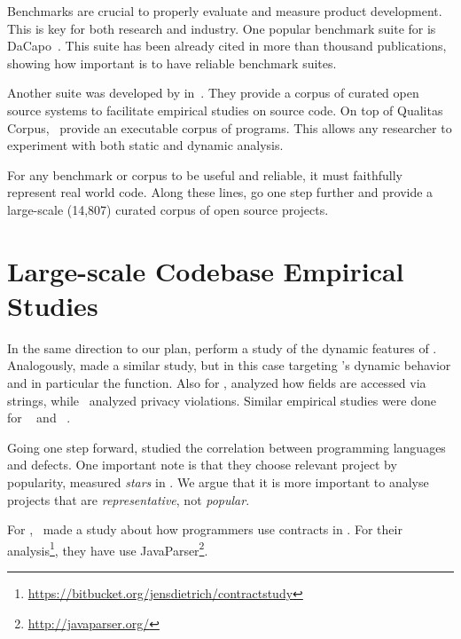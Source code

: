 Benchmarks are crucial to properly evaluate and measure product development.
This is key for both research and industry.
One popular benchmark suite for \java{} is DaCapo~\cite{blackburnDaCapoBenchmarksJava2006}.
This suite has been already cited in more than thousand publications, showing how important is to have reliable benchmark suites.

Another suite was developed by in~\cite{temperoQualitasCorpusCurated2010}.
They provide a corpus of curated open source systems to facilitate empirical studies on source code.
On top of Qualitas Corpus,~\cite{dietrichXCorpusExecutableCorpus2017} provide an executable corpus of \java{} programs.
This allows any researcher to experiment with both static and dynamic analysis.

For any benchmark or corpus to be useful and reliable, it must faithfully represent real world code.
Along these lines, \cite{allamanisMiningSourceCode2013} go one step further and provide a large-scale (14,807) curated corpus of open source \java{} projects.

\section{Large-scale Codebase Empirical Studies}
\label{sec:rw:largescale}

In the same direction to our plan, \cite{callauHowWhyDevelopers2013} perform a study of the dynamic features of \smalltalk{}. 
Analogously, \cite{richardsAnalysisDynamicBehavior2010,richardsEvalThatMen2011} made a similar study, but in this case targeting \javascript{}'s dynamic behavior and in particular the  function. 
Also for \javascript{}, \cite{madsenStringAnalysisDynamic2014} analyzed how fields are accessed via strings, while~\cite{jangEmpiricalStudyPrivacyviolating2010} analyzed privacy violations. 
Similar empirical studies were done for \php{}~\cite{hillsEmpiricalStudyPHP2013,dahseExperienceReportEmpirical2015,doyleEmpiricalStudyEvolution2011} and \swift{}~\cite{reboucasEmpiricalStudyUsage2016}.  

Going one step forward, \cite{rayLargescaleStudyProgramming2017} studied the correlation between programming languages and defects. 
One important note is that they choose relevant project by popularity, measured \emph{stars} in \github{}.
We argue that it is more important to analyse projects that are \emph{representative}, not \emph{popular}. 

For \java{},~\cite{dietrichContractsWildStudy2017a} made a study about how programmers use contracts in \mavencentral{}.
For their analysis\footnote{\url{https://bitbucket.org/jensdietrich/contractstudy}}, they have use JavaParser\footnote{\url{http://javaparser.org/}}.

